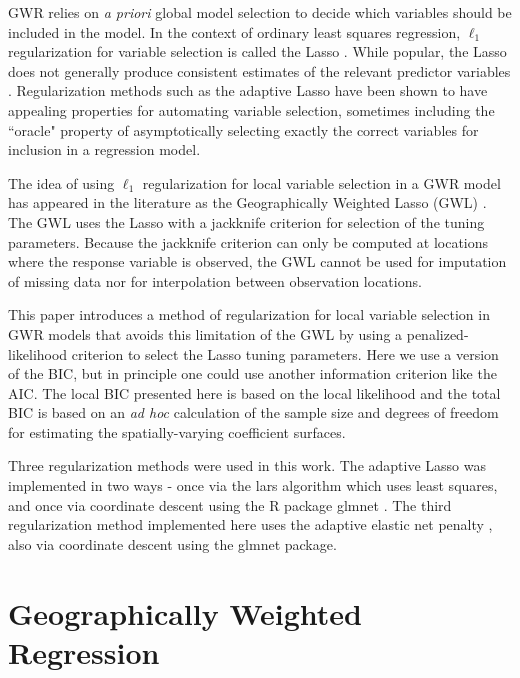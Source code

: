 \documentclass[authoryear, review, 11pt]{elsarticle}
\begin{document}
	GWR relies on \emph{a priori} global model selection to decide which variables should be included in the model. In the context of ordinary least squares regression, $\ell_1$ regularization for variable selection is called the Lasso \citep{Tibshirani:1996}. While popular, the Lasso does not generally produce consistent estimates of the relevant predictor variables \citep{Leng-2006}. Regularization methods such as the adaptive Lasso \citep{Zou:2006} have been shown to have appealing properties for automating variable selection, sometimes including the ``oracle" property of asymptotically selecting exactly the correct variables for inclusion in a regression model.
	
	The idea of using $\ell_1$ regularization for local variable selection in a GWR model has appeared in the literature as the Geographically Weighted Lasso (GWL) \citep{Wheeler:2009}. The GWL uses the Lasso with a jackknife criterion for selection of the tuning parameters. Because the jackknife criterion can only be computed at locations where the response variable is observed, the GWL cannot be used for imputation of missing data nor for interpolation between observation locations.
	
	This paper introduces a method of regularization for local variable selection in GWR models that avoids this limitation of the GWL by using a penalized-likelihood criterion to select the Lasso tuning parameters. Here we use a version of the BIC, but in principle one could use another information criterion like the AIC. The local BIC presented here is based on the local likelihood \citep{Loader:1999} and the total BIC is based on an \emph{ad hoc} calculation of the sample size and degrees of freedom for estimating the spatially-varying coefficient surfaces.
	
	Three regularization methods were used in this work. The adaptive Lasso was implemented in two ways - once via the lars algorithm \citep{Efron:2004b} which uses least squares, and once via coordinate descent using the R package glmnet \citep{Friedman:2010}. The third regularization method implemented here uses the adaptive elastic net penalty \citep{Zou:2009}, also via coordinate descent using the glmnet package.
	

\section{Geographically Weighted Regression \label{section:GWR}}
\end{document}
